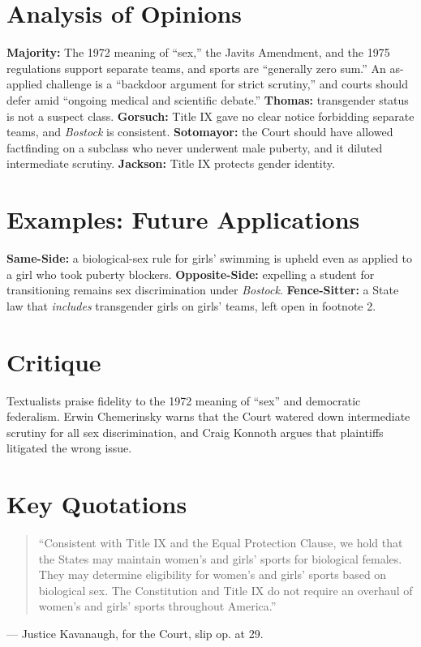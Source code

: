 \documentclass[12pt]{article}
\begin{document}
\section{Analysis of Opinions}
\textbf{Majority:} The 1972 meaning of ``sex,'' the Javits Amendment, and the 1975 regulations support separate teams, and sports are ``generally zero sum.'' An as-applied challenge is a ``backdoor argument for strict scrutiny,'' and courts should defer amid ``ongoing medical and scientific debate.'' \textbf{Thomas:} transgender status is not a suspect class. \textbf{Gorsuch:} Title IX gave no clear notice forbidding separate teams, and \textit{Bostock} is consistent. \textbf{Sotomayor:} the Court should have allowed factfinding on a subclass who never underwent male puberty, and it diluted intermediate scrutiny. \textbf{Jackson:} Title IX protects gender identity.

\section{Examples: Future Applications}
\textbf{Same-Side:} a biological-sex rule for girls' swimming is upheld even as applied to a girl who took puberty blockers. \textbf{Opposite-Side:} expelling a student for transitioning remains sex discrimination under \textit{Bostock}. \textbf{Fence-Sitter:} a State law that \textit{includes} transgender girls on girls' teams, left open in footnote 2.

\section{Critique}
Textualists praise fidelity to the 1972 meaning of ``sex'' and democratic federalism. Erwin Chemerinsky warns that the Court watered down intermediate scrutiny for all sex discrimination, and Craig Konnoth argues that plaintiffs litigated the wrong issue.

\section{Key Quotations}
\begin{quote}
``Consistent with Title IX and the Equal Protection Clause, we hold that the States may maintain women's and girls' sports for biological females. They may determine eligibility for women's and girls' sports based on biological sex. The Constitution and Title IX do not require an overhaul of women's and girls' sports throughout America.''
\end{quote}
\noindent --- Justice Kavanaugh, for the Court, slip op. at 29.
\end{document}

